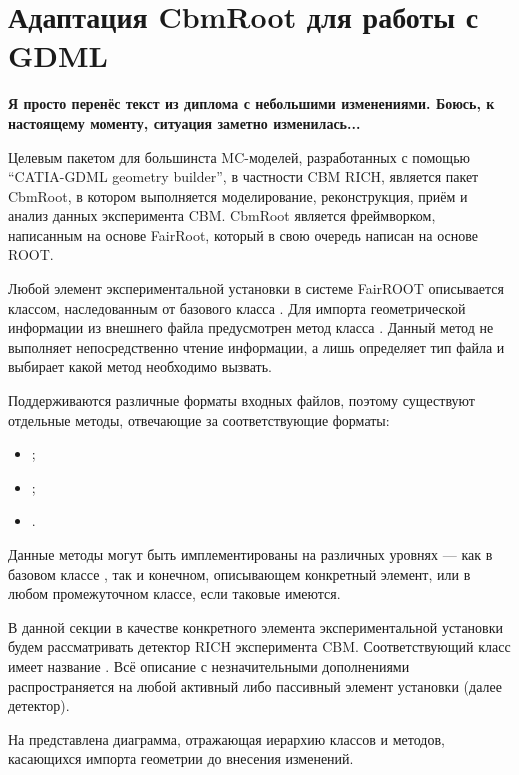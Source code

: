 \section{Адаптация CbmRoot для работы с GDML}\label{sec:FairModule}

\textbf{Я просто перенёс текст из диплома с небольшими изменениями. Боюсь, к настоящему моменту, ситуация заметно изменилась...}

Целевым пакетом для большинста MC-моделей, разработанных с помощью ``CATIA-GDML geometry builder'', в частности CBM RICH, является пакет CbmRoot, в котором выполняется моделирование, реконструкция, приём и анализ данных эксперимента CBM. CbmRoot является фреймворком, написанным на основе FairRoot, который в свою очередь написан на основе ROOT.

Любой элемент экспериментальной установки в системе FairROOT описывается классом, наследованным от базового класса . Для импорта геометрической информации из внешнего файла предусмотрен метод  класса . Данный метод не выполняет непосредственно чтение информации, а лишь определяет тип файла и выбирает какой метод необходимо вызвать.

Поддерживаются различные форматы входных файлов, поэтому существуют отдельные методы, отвечающие за соответствующие форматы:

\begin{itemize}
\item {};
\item {};
\item {}.
\end{itemize}

Данные методы могут быть имплементированы на различных уровнях --- как в базовом классе , так и конечном, описывающем конкретный элемент, или в любом промежуточном классе, если таковые имеются.

В данной секции в качестве конкретного элемента экспериментальной установки будем рассматривать детектор RICH эксперимента CBM. Соответствующий класс имеет название . Всё описание с незначительными дополнениями распространяется на любой активный либо пассивный элемент установки (далее детектор).

На  представлена диаграмма, отражающая иерархию классов и методов, касающихся импорта геометрии до внесения изменений.

